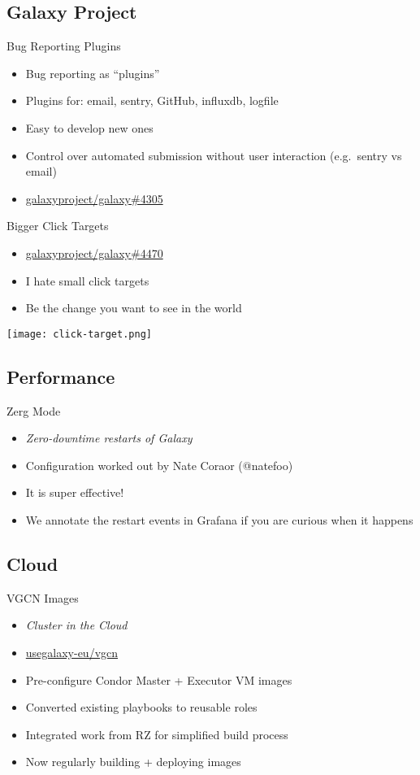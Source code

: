 \documentclass[12pt]{ufrslides}
\newcommand{\ghpr}[3]{\href{https://github.com/#1/#2/pull/#3}{#1/#2\##3}}
\newcommand{\ghproject}[2]{\href{https://github.com/#1/#2/}{#1/#2}}
\begin{document}
\subsection{Galaxy Project}
	\begin{frame}{Bug Reporting Plugins}
		\begin{itemize}
			\item Bug reporting as ``plugins''
			\item Plugins for: email, sentry, GitHub, influxdb, logfile
			\item Easy to develop new ones
			\item Control over automated submission without user interaction (e.g.~sentry vs email)
			\item \ghpr{galaxyproject}{galaxy}{4305}
		\end{itemize}
	\end{frame}

	\begin{frame}{Bigger Click Targets}
		\begin{itemize}
			\item \ghpr{galaxyproject}{galaxy}{4470}
			\item I hate small click targets
			\item Be the change you want to see in the world
		\end{itemize}
		\texttt{[image: click-target.png]}
	\end{frame}

\subsection{Performance}
	\begin{frame}{Zerg Mode}
		\begin{itemize}
			\item \emph{Zero-downtime restarts of Galaxy}
			\item Configuration worked out by Nate Coraor (@natefoo)
			\item It is super effective!
			\item We annotate the restart events in Grafana if you are curious when it happens
		\end{itemize}
	\end{frame}

\subsection{Cloud}
	\begin{frame}{VGCN Images}
		\begin{itemize}
			\item \emph{Cluster in the Cloud}
			\item \ghproject{usegalaxy-eu}{vgcn}
			\item Pre-configure Condor Master + Executor VM images
			\item Converted existing playbooks to reusable roles
			\item Integrated work from RZ for simplified build process
			\item Now regularly building + deploying images
		\end{itemize}
	\end{frame}
\end{document}
